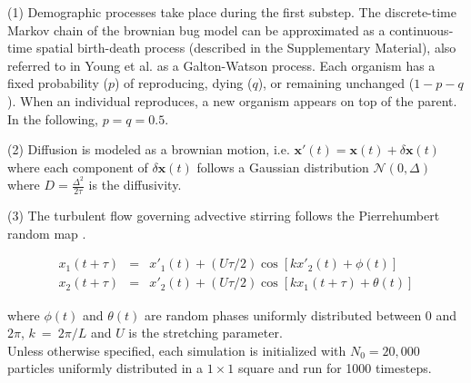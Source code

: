 (1) Demographic processes take place during the first substep. The discrete-time Markov chain of the brownian bug model can be approximated as a continuous-time spatial birth-death process (described in the Supplementary Material), also referred to in Young et al. \cite{young_reproductive_2001} as a Galton-Watson process. Each organism has a fixed probability ($p$) of reproducing, dying ($q$), or remaining unchanged ($1-p-q$). When an individual reproduces, a new organism appears on top of the parent. In the following, $p=q=0.5$.

(2) Diffusion is modeled as a brownian motion, i.e. $\boldsymbol{x'}(t)=\boldsymbol{x}(t)+\delta\boldsymbol{x}(t)$ where each component of $\delta\boldsymbol{x}(t)$ follows a Gaussian distribution $\mathcal{N}(0,\Delta)$ where $D=\frac{\Delta^2}{2\tau}$ is the diffusivity. 

(3) The turbulent flow governing advective stirring follows the Pierrehumbert random map \citep{pierrehumbert_tracer_1994}.

\begin{eqnarray}
 x_1(t+\tau)&=&x'_1(t)+(U\tau/2)\cos[kx'_2(t)+\phi(t)] \label{eq:map1} \\
 x_2(t+\tau)&=&x'_2(t)+(U\tau/2)\cos[kx_1(t+\tau)+\theta(t)] \label{eq:map2}
 \label{eq:pierrehumbert}
 \end{eqnarray}

 where $\phi(t)$ and $\theta(t)$ are random phases uniformly distributed between 0 and $2\pi$, $k~=~2\pi/L$ and $U$ is the stretching parameter. \\
 
Unless otherwise specified, each simulation is initialized with $N_0=20,000$ particles uniformly distributed in a $1\times 1$ square and run for 1000 timesteps. 
 
% 
% 
% 
